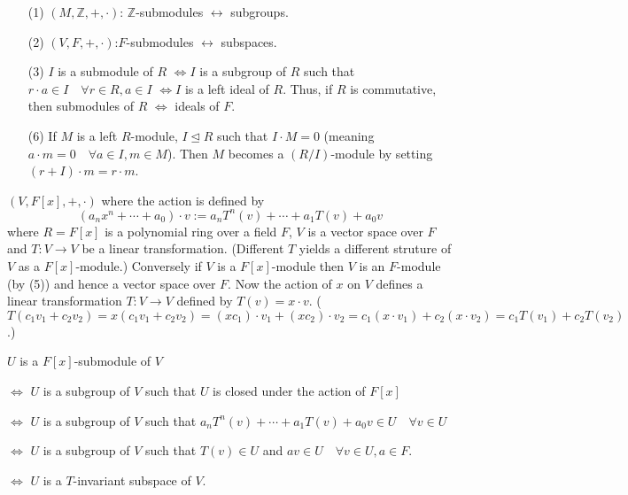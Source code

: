 \documentclass[12pt]{article}
\theoremstyle{definition}
\newcommand{\ZZ}{\mathbb Z}
\newcommand{\Lra}{\Leftrightarrow}
\newcommand{\lra}{\leftrightarrow}
\newcommand{\normto}{\trianglelefteq}
\begin{document}
\begin{ex}
	\begin{enumerate}
		\item[(1)] $(M,\ZZ,+,\cdot)$: $\ZZ$-submodules $\lra$ subgroups.

		\item[(2)] $(V,F,+, \cdot)$:$F$-submodules $\lra$ subspaces.

		\item[(3)]
			$I$ is a submodule of $R$ $\Lra I$ is a subgroup of $R$ such that $r \cdot a \in I \quad \forall r \in R, a \in I$ $\Lra I$ is a left ideal of $R$.
			Thus, if $R$ is commutative, then submodules of $R$ $\Lra$ ideals of $F$.
		\item[(6)] If $M$ is a left $R$-module, $I \normto R$ such that $I \cdot M = 0$ (meaning $a \cdot m = 0 \quad \forall a \in I ,m \in M$).
			Then $M$ becomes a $(R/I)$-module by setting $(r + I) \cdot m = r \cdot m$.

	\end{enumerate}
\end{ex}

\begin{ex}
	$(V, F[x],+,\cdot)$ where the action is defined by
	\[
		(a_n x^n + \cdots + a_0)\cdot v := a_n T^n(v) + \cdots + a_1 T(v) + a_0 v
	\]
	where $R = F[x]$ is a polynomial ring over a field $F$, $V$ is a vector space over $F$ and $T: V \to V$ be a linear transformation.
	(Different $T$ yields a different struture of $V$ as a $F[x]$-module.)
	Conversely if $V$ is a $F[x]$-module then $V$ is an $F$-module (by (5)) and hence a vector space over $F$.
	Now the action of $x$ on $V$ defines a linear transformation $T: V \to V$ defined by $T(v) = x \cdot v$.
	($T(c_1 v_1 + c_2 v_2) = x (c_1 v_1 + c_2 v_2) = (x c_1) \cdot v_1 + (x c_2) \cdot v_2 = c_1 (x \cdot v_1) + c_2 (x \cdot v_2) = c_1 T(v_1) + c_2 T(v_2)$.)


	$U$ is a $F[x]$-submodule of $V$

	\noindent $\Lra$ $U$ is a subgroup of $V$ such that $U$ is closed under the action of $F[x]$

	\noindent $\Lra$ $U$ is a subgroup of $V$ such that $a_n T^n (v) + \cdots + a_1 T(v) + a_0 v \in U \quad \forall v \in U$

	\noindent $\Lra$ $U$ is a subgroup of $V$ such that $T(v) \in U$ and $av \in U \quad \forall v \in U, a \in F$.

	\noindent $\Lra$ $U$ is a $T$-invariant subspace of $V$.
\end{ex}
\end{document}
